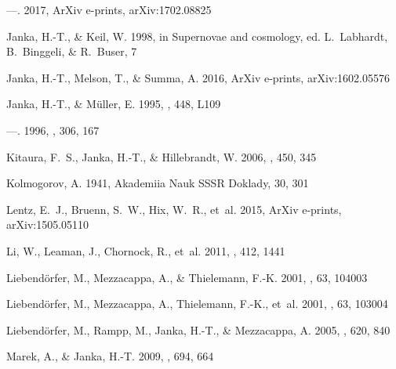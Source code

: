 \documentclass[twocolumn]{aastex6}
\begin{document}
\begin{thebibliography}{}
---. 2017, ArXiv e-prints, arXiv:1702.08825

{Janka}, H.-T., \& {Keil}, W. 1998, in Supernovae and cosmology, ed.
  L.~{Labhardt}, B.~{Binggeli}, \& R.~{Buser}, 7

{Janka}, H.-T., {Melson}, T., \& {Summa}, A. 2016, ArXiv e-prints,
  arXiv:1602.05576

{Janka}, H.-T., \& {M\"{u}ller}, E. 1995, \apjl, 448, L109

---. 1996, \aap, 306, 167

{Kitaura}, F.~S., {Janka}, H.-T., \& {Hillebrandt}, W. 2006, \aap, 450, 345

{Kolmogorov}, A. 1941, Akademiia Nauk SSSR Doklady, 30, 301

{Lentz}, E.~J., {Bruenn}, S.~W., {Hix}, W.~R., {et~al.} 2015, ArXiv e-prints,
  arXiv:1505.05110

{Li}, W., {Leaman}, J., {Chornock}, R., {et~al.} 2011, \mnras, 412, 1441

{Liebend{\"o}rfer}, M., {Mezzacappa}, A., \& {Thielemann}, F.-K.
  2001{}, \prd, 63, 104003

{Liebend{\"o}rfer}, M., {Mezzacappa}, A., {Thielemann}, F.-K., {et~al.}
  2001{}, \prd, 63, 103004

{Liebend{\"o}rfer}, M., {Rampp}, M., {Janka}, H.-T., \& {Mezzacappa}, A. 2005,
  \apj, 620, 840

{Marek}, A., \& {Janka}, H.-T. 2009, \apj, 694, 664


\end{thebibliography}
\end{document}
